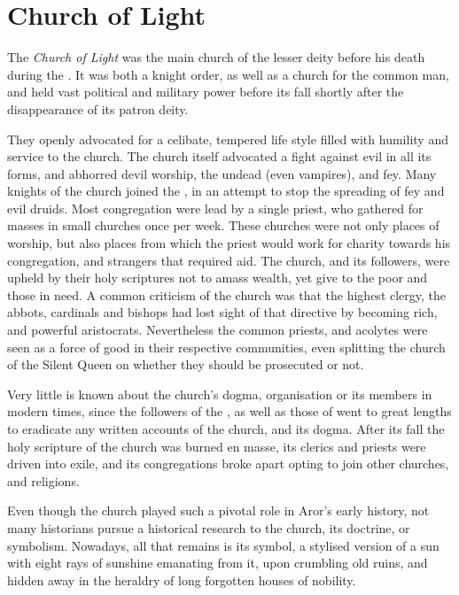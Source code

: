 \section{Church of Light}
\label{sec:Church of Light}

The \emph{Church of Light} was the main church of the lesser deity
 before his death during the . It was both a knight order, as well as a church for the common man,
and held vast political and military power before its fall shortly after
the disappearance of its patron deity.

They openly advocated for a celibate, tempered life style filled with humility
and service to the church. The church itself advocated a fight against evil in
all its forms, and abhorred devil worship, the undead (even vampires), and
fey. Many knights of the church joined the , in an
attempt to stop the spreading of fey and evil druids. Most congregation were
lead by a single priest, who gathered for masses in small churches once per
week. These churches were not only places of worship, but also places from
which the priest would work for charity towards his congregation, and
strangers that required aid. The church, and its followers, were upheld by
their holy scriptures not to amass wealth, yet give to the poor and those in
need. A common criticism of the church was that the highest clergy, the
abbots, cardinals and bishops had lost sight of that directive by becoming
rich, and powerful aristocrats. Nevertheless the common priests, and acolytes
were seen as a force of good in their respective communities, even splitting
the church of the Silent Queen on whether they should be prosecuted or not.

Very little is known about the church's dogma, organisation or its members in
modern times, since the followers of the , as well
as those of  went to great lengths to eradicate any written
accounts of the church, and its dogma. After its fall the holy scripture of
the church was burned en masse, its clerics and priests were driven into exile,
and its congregations broke apart opting to join other churches, and religions.

Even though the church played such a pivotal role in Aror's early history,
not many historians pursue a historical research to the church, its doctrine,
or symbolism. Nowadays, all that remains is its symbol, a stylised version of
a sun with eight rays of sunshine emanating from it, upon crumbling old ruins,
and hidden away in the heraldry of long forgotten houses of nobility.
